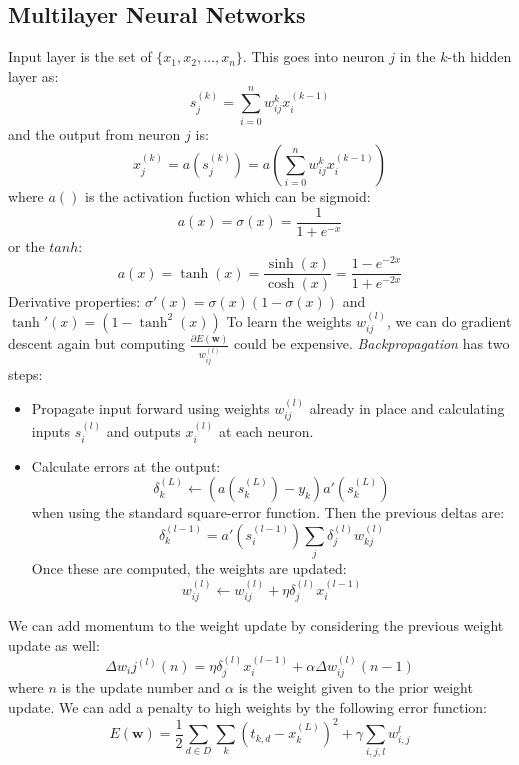 \documentclass[a4paper,10pt]{article}
\begin{document}
\subsection{Multilayer Neural Networks}
Input layer is the set of $\{x_1, x_2, \ldots, x_n\}$.  This goes into neuron $j$ in the $k$-th hidden layer as:
$$
s_j^{(k)} = \sum_{i=0}^n w_{ij}^{k} x_i^{(k-1)}
$$
and the output from neuron $j$ is:
$$
x_j^{(k)} = a\left( s_j^{(k)}\right) = a\left(\sum_{i=0}^n w_{ij}^{k} x_i^{(k-1)}\right)
$$
where $a()$ is the activation fuction which can be sigmoid:
$$
a(x) = \sigma(x) = \frac{1}{1 + e^{-x}}
$$
or the $tanh$:
$$
a(x) = \tanh(x) = \frac{\sinh(x)}{\cosh(x)} = \frac{1- e^{-2x}}{1 + e^{-2x}}
$$
Derivative properties: $\sigma'(x) = \sigma(x)(1 - \sigma(x))$ and $\tanh'(x) = (1 - \tanh^2(x))$  To learn the weights $w_{ij}^{(l)}$, we can do gradient descent again but computing $\frac{\partial E(\mathbf{w})}{w_{ij}^{(l)}}$ could be expensive.  \emph{Backpropagation} has two steps:
\begin{itemize}
\item Propagate input forward using weights $w_{ij}^{(l)}$ already in place and calculating inputs $s_i^{(l)}$ and outputs $x_i^{(l)}$ at each neuron.  
\item Calculate errors at the output:
$$
\delta_k^{(L)} \leftarrow (a(s_k^{(L)}) - y_k) a'(s_k^{(L)})
$$
when using the standard square-error function.  Then the previous deltas are:
$$
\delta_k^{(l-1)} = a'(s_i^{(l-1)}) \sum_j \delta_j^{(l)} w_{kj}^{(l)}
$$
Once these are computed, the weights are updated:
$$
w_{ij}^{(l)} \leftarrow w_{ij}^{(l)} + \eta\delta_j^{(l)}x_{i}^{(l-1)}
$$
\end{itemize}
We can add momentum to the weight update by considering the previous weight update as well:
$$
\Delta w_ij^{(l)}(n) = \eta \delta_j^{(l)} x_i^{(l-1)} + \alpha\Delta w_{ij}^{(l)}(n-1)
$$
where $n$ is the update number and $\alpha$ is the weight given to the prior weight update.  We can add a penalty to high weights by the following error function:
$$
E(\mathbf{w}) = \frac{1}{2}\sum_{d\in D}\sum_{k} (t_{k,d} - x_k^{(L)})^2 + \gamma\sum_{i,j,l}w_{i,j}^{l}
$$
\end{document}
